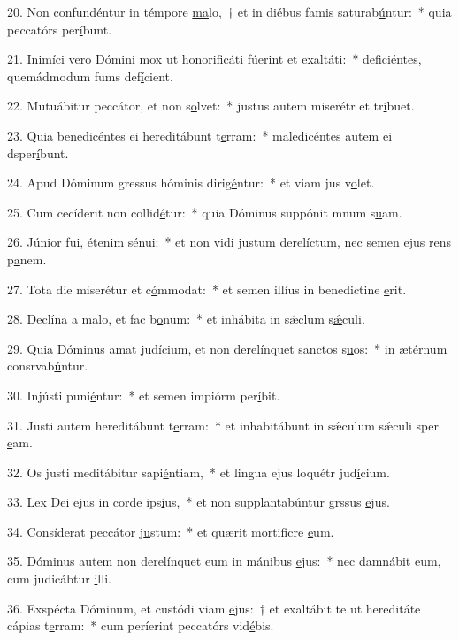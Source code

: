 20. Non confundéntur in témpore \uline{ma}lo,~† et in diébus famis saturab\uline{ú}ntur:~* quia peccatórs per\uline{í}bunt.\par 
21. Inimíci vero Dómini mox ut honorificáti fúerint et exalt\uline{á}ti:~* deficiéntes, quemádmodum fums def\uline{í}cient.\par 
22. Mutuábitur peccátor, et non s\uline{o}lvet:~* justus autem miserétr et tr\uline{í}buet.\par 
23. Quia benedicéntes ei hereditábunt t\uline{e}rram:~* maledicéntes autem ei dsper\uline{í}bunt.\par 
24. Apud Dóminum gressus hóminis dirig\uline{é}ntur:~* et viam jus v\uline{o}let.\par 
25. Cum cecíderit non collid\uline{é}tur:~* quia Dóminus suppónit mnum s\uline{u}am.\par 
26. Júnior fui, étenim s\uline{é}nui:~* et non vidi justum derelíctum, nec semen ejus rens p\uline{a}nem.\par 
27. Tota die miserétur et c\uline{ó}mmodat:~* et semen illíus in benedictine \uline{e}rit.\par 
28. Declína a malo, et fac b\uline{o}num:~* et inhábita in sǽclum s\uline{ǽ}culi.\par 
29. Quia Dóminus amat judícium, et non derelínquet sanctos s\uline{u}os:~* in ætérnum consrvab\uline{ú}ntur.\par 
30. Injústi puni\uline{é}ntur:~* et semen impiórm per\uline{í}bit.\par 
31. Justi autem hereditábunt t\uline{e}rram:~* et inhabitábunt in sǽculum sǽculi sper \uline{e}am.\par 
32. Os justi meditábitur sapi\uline{é}ntiam,~* et lingua ejus loquétr jud\uline{í}cium.\par 
33. Lex Dei ejus in corde ips\uline{í}us,~* et non supplantabúntur grssus \uline{e}jus.\par 
34. Consíderat peccátor j\uline{u}stum:~* et quærit mortificre \uline{e}um.\par 
35. Dóminus autem non derelínquet eum in mánibus \uline{e}jus:~* nec damnábit eum, cum judicábtur \uline{i}lli.\par 
36. Exspécta Dóminum, et custódi viam \uline{e}jus:~† et exaltábit te ut hereditáte cápias t\uline{e}rram:~* cum períerint peccatórs vid\uline{é}bis.\par 
